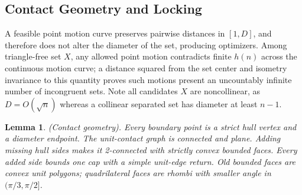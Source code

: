 \documentclass[10pt,reqno]{amsart}
\newtheorem{lemma}{Lemma}[section]
\begin{document}
\subsection{Contact Geometry and Locking}



A feasible point motion curve preserves pairwise distances in $[1, D]$, and therefore does not alter the diameter of the set, producing optimizers. Among triangle-free set $X$, any allowed point motion contradicts finite $h(n)$ across the continuous motion curve; a distance squared from the set center and isometry invariance to this quantity proves such motions present an uncountably infinite number of incongruent sets. Note all candidates $X$ are noncollinear, as $D = O(\sqrt{n})$ whereas a collinear separated set has diameter at least $n - 1$.



\begin{lemma}
    (Contact geometry). Every boundary point is a strict hull vertex and a diameter endpoint. The unit-contact graph is connected and plane. Adding missing hull sides makes it 2-connected with strictly convex bounded faces. Every added side bounds one cap with a simple unit-edge return. Old bounded faces are convex unit polygons; quadrilateral faces are rhombi with smaller angle in $(\pi / 3, \pi / 2]$.
\end{lemma}
\end{document}
